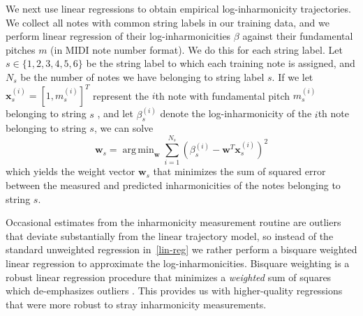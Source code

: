 \documentclass[convention,peer-reviewed]{aesconf}
\DeclareMathOperator*{\argmin}{arg\,min}
\begin{document}
We next use linear regressions to obtain empirical log-inharmonicity trajectories. We collect all notes with common string labels in our training data, and we perform linear regression of their log-inharmonicities $\beta$ against their fundamental pitches $m$ (in MIDI note number format). We do this for each string label. Let $s \in \{1,2,3,4,5,6\}$ be the string label to which each training note is assigned, and $N_s$ be the number of notes we have belonging to string label $s$. If we let $\mathbf{x}_s^{(i)} = [1, m_s^{(i)}]^T$ represent the $i$th note with fundamental pitch $m^{(i)}_s$ belonging to string $s$ , and let $\beta_s^{(i)}$ denote the log-inharmonicity of the $i$th note belonging to string $s$, we can solve
\begin{equation}
\label{lin-reg}
\mathbf{w}_s = \argmin_{\mathbf{w}}{\sum_{i=1}^{N_s}{(\beta^{(i)}_s - \mathbf{w}^T\mathbf{x}^{(i)}_s)^2}}
\end{equation}
which yields the weight vector $\mathbf{w}_s$ that minimizes the sum of squared error between the measured and predicted inharmonicities of the notes belonging to string $s$.

Occasional estimates from the inharmonicity measurement routine are outliers that deviate substantially from the linear trajectory model, so instead of the standard unweighted regression in~\eqref{lin-reg} we rather perform a bisquare weighted linear regression to approximate the log-inharmonicities. Bisquare weighting is a robust linear regression procedure that minimizes a \textit{weighted} sum of squares which de-emphasizes outliers \citep{matlab-robustfit}. This provides us with higher-quality regressions that were more robust to stray inharmonicity measurements.
\end{document}
